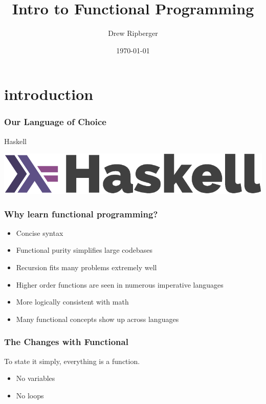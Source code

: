 \documentclass{beamer}
\title{Intro to Functional Programming}
\author{Drew Ripberger}
\date{\today}
\begin{document}
\frame{\titlepage}

\section{introduction}

\begin{frame}
  \frametitle{Our Language of Choice}
  \begin{block}{Haskell}
  \end{block}
  \includegraphics[width=.5\linewidth]{haskell-logo.pdf}
  \centering
\end{frame}


\begin{frame}
  \frametitle{Why learn functional programming?}
  \begin{itemize}
  \item Concise syntax
  \item Functional purity simplifies large codebases
  \item Recursion fits many problems extremely well
  \item Higher order functions are seen in numerous imperative languages
  \item More logically consistent with math
  \item Many functional concepts show up across languages
  \end{itemize}
\end{frame}

\begin{frame}
  \frametitle{The Changes with Functional}
  To state it simply, everything is a function.
  \begin{itemize}
  \item No variables
  \item No loops
  \end{itemize}
\end{frame}
\end{document}
